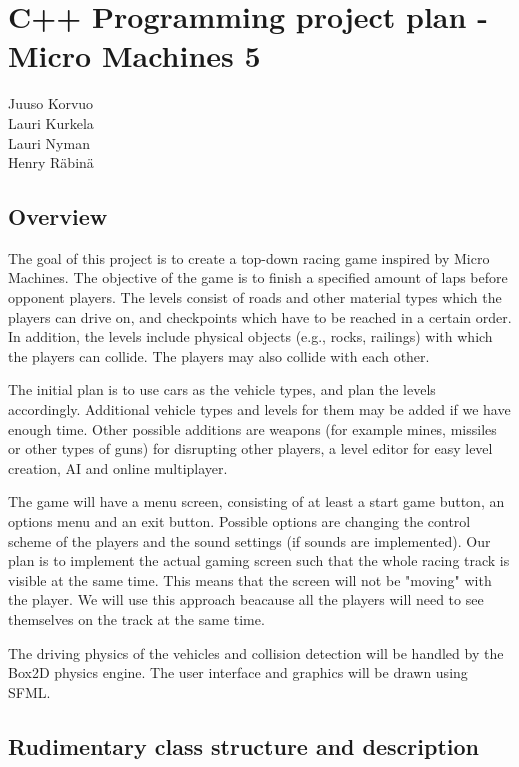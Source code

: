 \documentclass{article}
\begin{document}
\section*{C++ Programming project plan - Micro Machines 5}
{\large Juuso Korvuo}\\
{\large Lauri Kurkela}\\
{\large Lauri Nyman}\\
{\large Henry Räbinä}

\subsection*{Overview}

The goal of this project is to create a top-down racing game inspired by Micro Machines. The objective of the game is to finish a specified amount of laps before opponent players. The levels consist of roads and other material types which the players can drive on, and checkpoints which have to be reached in a certain order. In addition, the levels include physical objects (e.g., rocks, railings) with which the players can collide. The players may also collide with each other.

The initial plan is to use cars as the vehicle types, and plan the levels accordingly. Additional vehicle types and levels for them may be added if we have enough time. Other possible additions are weapons (for example mines, missiles or other types of guns) for disrupting other players, a level editor for easy level creation, AI and online multiplayer.

The game will have a menu screen, consisting of at least a start game button, an options menu and an exit button. Possible options are changing the control scheme of the players and the sound settings (if sounds are implemented). Our plan is to implement the actual gaming screen such that the whole racing track is visible at the same time. This means that the screen will not be "moving" with the player. We will use this approach beacause all the players will need to see themselves on the track at the same time.

The driving physics of the vehicles and collision detection will be handled by the Box2D physics engine. The user interface and graphics will be drawn using SFML.

\subsection*{Rudimentary class structure and description}
\end{document}
